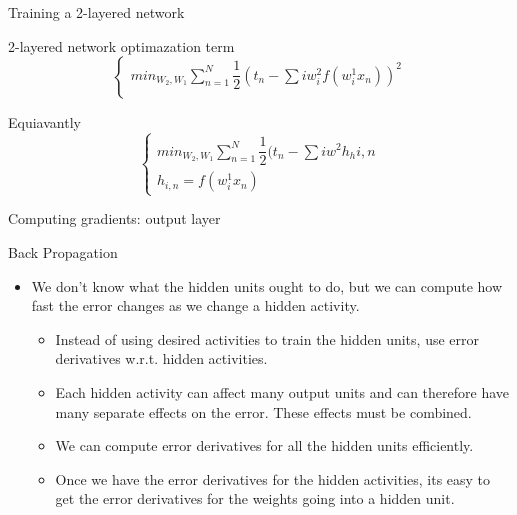 \begin{frame}{Training a 2-layered network}
    \begin{block}{2-layered network optimazation term}
        \[
            \begin{cases}
                min_{W_2, W_1} \sum_{n=1}^{N} \dfrac{1}{2} (t_n - \sum{i}{} w^2_if(w^1_ix_n))^2 \\
            \end{cases}
        \]
    \end{block}
    \begin{block}{Equiavantly}
        \[
            \begin{cases}
                min_{W_2, W_1} \sum_{n=1}^{N} \dfrac{1}{2} (t_n - \sum{i}{} w^2h_h{i,n}
                \\
                h_{i,n} = f(w^1_ix_n)
            \end{cases}
        \]
    \end{block}
    \begin{block}{Computing gradients: output layer}
        
    \end{block}
\end{frame}

\begin{frame}{Back Propagation}
    \begin{itemize}
        \item We don’t know what the hidden units ought to do,
but we can compute how fast the error changes as
we change a hidden activity.
        \begin{itemize}
            \item Instead of using desired activities to train the
hidden units, use error derivatives w.r.t. hidden
activities.
            \item Each hidden activity can affect many output units
and can therefore have many separate effects on
the error. These effects must be combined.
            \item We can compute error derivatives for all the
hidden units efficiently.
            \item Once we have the error derivatives for the
hidden activities, its easy to get the error
derivatives for the weights going into a hidden
unit.
        \end{itemize}
    \end{itemize}
\end{frame}

